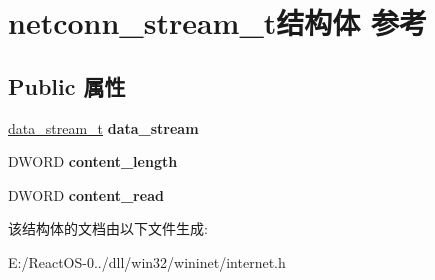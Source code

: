 \hypertarget{structnetconn__stream__t}{}\section{netconn\+\_\+stream\+\_\+t结构体 参考}
\label{structnetconn__stream__t}
\subsection*{Public 属性}
\begin{DoxyCompactItemize}
\item 
\mbox{\label{structnetconn__stream__t_af195589e7dc72178eda548cf5f159b89}} 
\hyperlink{structdata__stream__t}{data\+\_\+stream\+\_\+t} {\bfseries data\+\_\+stream}
\item 
\mbox{\label{structnetconn__stream__t_a5fb1b362d9aa61f4bc0cd203c8f2108e}} 
D\+W\+O\+RD {\bfseries content\+\_\+length}
\item 
\mbox{\label{structnetconn__stream__t_a96ec54dfa8795e69c6111957cce4166e}} 
D\+W\+O\+RD {\bfseries content\+\_\+read}
\end{DoxyCompactItemize}


该结构体的文档由以下文件生成\+:\begin{DoxyCompactItemize}
\item 
E\+:/\+React\+O\+S-\/0../dll/win32/wininet/internet.\+h\end{DoxyCompactItemize}
